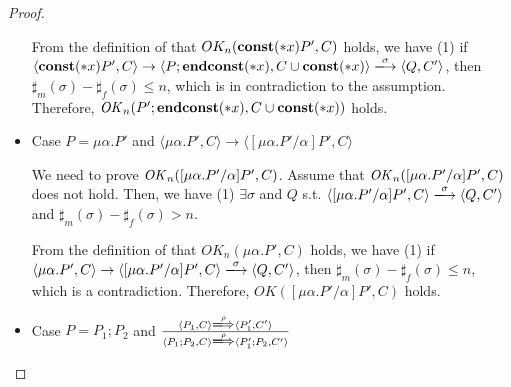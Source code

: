 \begin{proof}
\begin{itemize}
  From the definition of that \(OK_n(\mathbf{const}(*x) P', C)\) holds, we
  have (1) if \( \langle \scon\Sirx P', C \rangle \rightarrow \langle
  P;\Endconst, C\cup{\scon\Sirx} \rangle \xlongrightarrow{\sigma}
  \langle Q, C' \rangle \), then \(\sharp_m(\sigma) -
  \sharp_f(\sigma) \le n \), which is in
  contradiction to the assumption.  Therefore, \(\mathit{OK}_n(P';\mathbf{endconst}(*x), C\cup{\mathbf{const}(*x)})\)
  holds.

\item Case \( P = \mu\alpha.P' \) and \( \langle \mu\alpha.P', C
  \rangle \rightarrow \langle [\mu\alpha.P'/\alpha]P', C \rangle \)

  We need to prove \(\mathit{OK}_n([\mu\alpha.P'/\alpha]P', C) \).  Assume
  that \(\mathit{OK}_n( [\mu\alpha.P'/\alpha]P', C) \) does not hold. Then, we
  have (1) \( \exists \sigma \) and \(Q\) s.t. \( \langle
  [\mu\alpha.P'/\alpha]P', C \rangle \xlongrightarrow{\sigma} \langle
  Q, C' \rangle \) and \(\sharp_{m}(\sigma) -
  \sharp_{f}(\sigma) > n\).

  From the definition of that \(OK_n(\mu\alpha.P', C)\) holds, we have
  (1) if \( \langle \mu\alpha.P', C \rangle \rightarrow \langle
  [\mu\alpha.P'/\alpha]P', C \rangle \xlongrightarrow{\sigma} \langle
  Q, C' \rangle \), then \(\sharp_m(\sigma) -
  \sharp_f(\sigma) \le n \), which is a contradiction. Therefore,
  \(OK([\mu\alpha.P'/\alpha]P', C) \) holds.




\item Case \( P = P_1;P_2 \) and \( \frac{ \langle P_1, C \rangle
  \xLongrightarrow{\rho} \langle P_1', C' \rangle} { \langle P_1;P_2,
  C \rangle \xLongrightarrow{\rho} \langle P_1';P_2, C' \rangle } \)


\end{itemize}
\end{proof}
